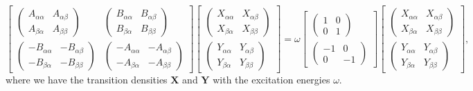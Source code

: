 \documentclass[12pt]{article}
\begin{document}
\begin{equation}
\begin{bmatrix}
\begin{pmatrix}
    A_{\alpha \alpha} & A_{\alpha \beta} \\
    A_{\beta \alpha} & A_{\beta \beta}
\end{pmatrix}
& 
\begin{pmatrix}
    B_{\alpha \alpha} & B_{\alpha \beta} \\
    B_{\beta \alpha} & B_{\beta \beta}
\end{pmatrix}
\\
\begin{pmatrix}
    -B_{\alpha \alpha} & -B_{\alpha \beta} \\
    -B_{\beta \alpha} & -B_{\beta \beta}
\end{pmatrix}
&
\begin{pmatrix}
    -A_{\alpha \alpha} & -A_{\alpha \beta} \\
    -A_{\beta \alpha} & -A_{\beta \beta}
\end{pmatrix}
\end{bmatrix}
\begin{bmatrix}
\begin{pmatrix}
    X_{\alpha \alpha} & X_{\alpha \beta} \\
    X_{\beta \alpha} & X_{\beta \beta}
\end{pmatrix}
\\
\begin{pmatrix}
    Y_{\alpha \alpha} & Y_{\alpha \beta} \\
    Y_{\beta \alpha} & Y_{\beta \beta}
\end{pmatrix}
\end{bmatrix}
=
\omega
\begin{bmatrix}
\begin{pmatrix}
    1 & 0 \\
    0 & 1
\end{pmatrix}
\\
\begin{pmatrix}
    -1 & 0 \\
    0 & -1
\end{pmatrix}
\end{bmatrix}
\begin{bmatrix}
\begin{pmatrix}
    X_{\alpha \alpha} & X_{\alpha \beta} \\
    X_{\beta \alpha} & X_{\beta \beta}
\end{pmatrix}
\\
\begin{pmatrix}
    Y_{\alpha \alpha} & Y_{\alpha \beta} \\
    Y_{\beta \alpha} & Y_{\beta \beta}
\end{pmatrix}
\end{bmatrix},
\label{eq: RPA equation}
\end{equation}
where we have the transition densities $\textbf{X}$ and $\textbf{Y}$ with the excitation energies $\omega$.
\end{document}
